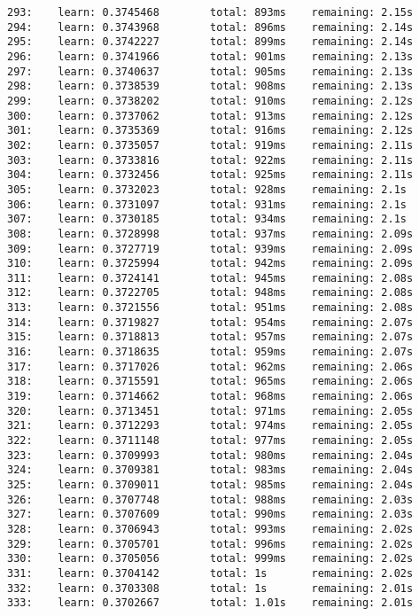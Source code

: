 \documentclass[11pt]{article}
\begin{document}
\begin{Verbatim}[commandchars=\\\{\}]
293:    learn: 0.3745468        total: 893ms    remaining: 2.15s
294:    learn: 0.3743968        total: 896ms    remaining: 2.14s
295:    learn: 0.3742227        total: 899ms    remaining: 2.14s
296:    learn: 0.3741966        total: 901ms    remaining: 2.13s
297:    learn: 0.3740637        total: 905ms    remaining: 2.13s
298:    learn: 0.3738539        total: 908ms    remaining: 2.13s
299:    learn: 0.3738202        total: 910ms    remaining: 2.12s
300:    learn: 0.3737062        total: 913ms    remaining: 2.12s
301:    learn: 0.3735369        total: 916ms    remaining: 2.12s
302:    learn: 0.3735057        total: 919ms    remaining: 2.11s
303:    learn: 0.3733816        total: 922ms    remaining: 2.11s
304:    learn: 0.3732456        total: 925ms    remaining: 2.11s
305:    learn: 0.3732023        total: 928ms    remaining: 2.1s
306:    learn: 0.3731097        total: 931ms    remaining: 2.1s
307:    learn: 0.3730185        total: 934ms    remaining: 2.1s
308:    learn: 0.3728998        total: 937ms    remaining: 2.09s
309:    learn: 0.3727719        total: 939ms    remaining: 2.09s
310:    learn: 0.3725994        total: 942ms    remaining: 2.09s
311:    learn: 0.3724141        total: 945ms    remaining: 2.08s
312:    learn: 0.3722705        total: 948ms    remaining: 2.08s
313:    learn: 0.3721556        total: 951ms    remaining: 2.08s
314:    learn: 0.3719827        total: 954ms    remaining: 2.07s
315:    learn: 0.3718813        total: 957ms    remaining: 2.07s
316:    learn: 0.3718635        total: 959ms    remaining: 2.07s
317:    learn: 0.3717026        total: 962ms    remaining: 2.06s
318:    learn: 0.3715591        total: 965ms    remaining: 2.06s
319:    learn: 0.3714662        total: 968ms    remaining: 2.06s
320:    learn: 0.3713451        total: 971ms    remaining: 2.05s
321:    learn: 0.3712293        total: 974ms    remaining: 2.05s
322:    learn: 0.3711148        total: 977ms    remaining: 2.05s
323:    learn: 0.3709993        total: 980ms    remaining: 2.04s
324:    learn: 0.3709381        total: 983ms    remaining: 2.04s
325:    learn: 0.3709011        total: 985ms    remaining: 2.04s
326:    learn: 0.3707748        total: 988ms    remaining: 2.03s
327:    learn: 0.3707609        total: 990ms    remaining: 2.03s
328:    learn: 0.3706943        total: 993ms    remaining: 2.02s
329:    learn: 0.3705701        total: 996ms    remaining: 2.02s
330:    learn: 0.3705056        total: 999ms    remaining: 2.02s
331:    learn: 0.3704142        total: 1s       remaining: 2.02s
332:    learn: 0.3703308        total: 1s       remaining: 2.01s
333:    learn: 0.3702667        total: 1.01s    remaining: 2.01s

\end{Verbatim}
\end{document}
